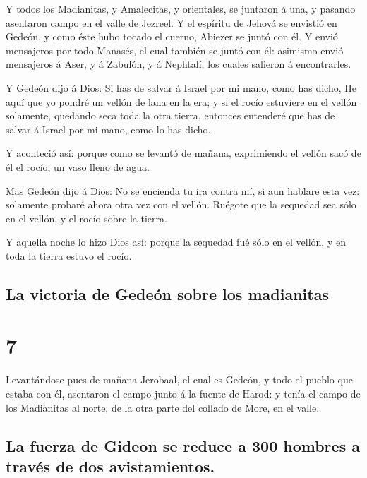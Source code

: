  Y todos los Madianitas, y Amalecitas, y orientales, se
juntaron á una, y pasando asentaron campo en el valle de Jezreel.
 Y el espíritu de Jehová se envistió en Gedeón, y como éste
hubo tocado el cuerno, Abiezer se juntó con él.  Y envió
mensajeros por todo Manasés, el cual también se juntó con él: asimismo
envió mensajeros á Aser, y á Zabulón, y á Nephtalí, los cuales salieron
á encontrarles.

 Y Gedeón dijo á Dios: Si has de salvar á Israel por mi
mano, como has dicho,  He aquí que yo pondré un vellón de
lana en la era; y si el rocío estuviere en el vellón solamente, quedando
seca toda la otra tierra, entonces entenderé que has de salvar á Israel
por mi mano, como lo has dicho.

 Y aconteció así: porque como se levantó de mañana,
exprimiendo el vellón sacó de él el rocío, un vaso lleno de agua.

 Mas Gedeón dijo á Dios: No se encienda tu ira contra mí,
si aun hablare esta vez: solamente probaré ahora otra vez con el vellón.
Ruégote que la sequedad sea sólo en el vellón, y el rocío sobre la
tierra.

 Y aquella noche lo hizo Dios así: porque la sequedad fué
sólo en el vellón, y en toda la tierra estuvo el rocío.

\hypertarget{la-victoria-de-gedeuxf3n-sobre-los-madianitas}{%
\subsection{La victoria de Gedeón sobre los
madianitas}\label{la-victoria-de-gedeuxf3n-sobre-los-madianitas}}

\hypertarget{section-6}{%
\section{7}\label{section-6}}

 Levantándose pues de mañana Jerobaal, el cual es Gedeón, y
todo el pueblo que estaba con él, asentaron el campo junto á la fuente
de Harod: y tenía el campo de los Madianitas al norte, de la otra parte
del collado de More, en el valle.

\hypertarget{la-fuerza-de-gideon-se-reduce-a-300-hombres-a-travuxe9s-de-dos-avistamientos.}{%
\subsection{La fuerza de Gideon se reduce a 300 hombres a través de dos
avistamientos.}\label{la-fuerza-de-gideon-se-reduce-a-300-hombres-a-travuxe9s-de-dos-avistamientos.}}


